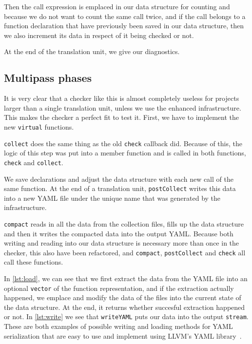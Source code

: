 Then the call expression is emplaced in our data structure for counting and because we do not want to count the same call twice, and if
the call belongs to a function declaration that have previously been saved in our data structure, then we also increment its data in
respect of it being checked or not.

At the end of the translation unit, we give our diagnostics.

\subsection{Multipass phases}

It is very clear that a checker like this is almost completely useless for projects larger than a single translation unit, unless we use
the enhanced infrastructure. This makes the checker a perfect fit to test it. First, we have to implement the new \texttt{virtual} functions.

\texttt{collect} does the same thing as the old \texttt{check} callback did. Because of this, the logic of this step was put
into a member function and is called in both functions, \texttt{check} and \texttt{collect}.

We save declarations and adjust the data structure with each new call of the same function. At the end of a translation unit, \texttt{postCollect}
writes this data into a new YAML file under the unique name that was generated by the infrastructure.

\texttt{compact} reads in all the data from the collection files, fills up the data structure and then it writes the compacted data into the output YAML.
Because both writing and reading into our data structure is necessary more than once in the checker, this also have been refactored, and \texttt{compact},
\texttt{postCollect} and \texttt{check} all call these functions.

In \cref{lst:load}, we can see that we first extract the data from the YAML file into an optional \texttt{vector} of the function representation,
and if the extraction actually happened, we emplace and modify the data of the files into the current state of the data structure. At the end, it returns
whether succesful extraction happened or not.
In \cref{lst:write} we see that \texttt{writeYAML} puts our data into the output \texttt{stream}.
These are both examples of possible writing and loading methods for YAML serialization that are easy to use and implement using LLVM's YAML library~\cite{yamllib}.

